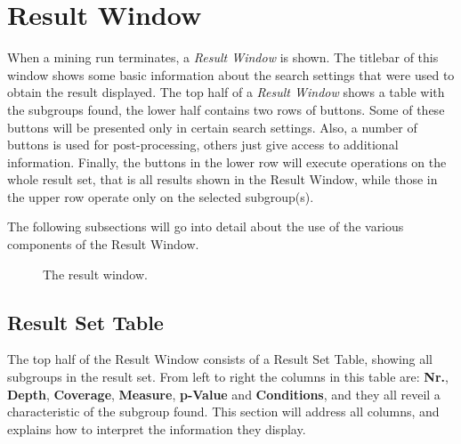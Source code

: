 \documentclass{article}
\begin{document}
\section{Result Window}
\label{section:result-window}
When a mining run terminates, a \emph{Result Window} is shown.
The titlebar of this window shows some basic information about the search settings that were used to obtain the result displayed.
The top half of a \emph{Result Window} shows a table with the subgroups found, the lower half contains two rows of buttons.
Some of these buttons will be presented only in certain search settings.
Also, a number of buttons is used for post-processing, others just give access to additional information.
Finally, the buttons in the lower row will execute operations on the whole result set, that is all results shown in the Result Window, while those in the upper row operate only on the selected subgroup(s).

The following subsections will go into detail about the use of the various components of the Result Window.

\begin{figure}
\begin{center}
\centering
{}
\caption{The result window.}
\end{center}
\label{fig:resultwindow}
\end{figure}


\subsection{Result Set Table}
\label{result-window:result-set-table}
The top half of the Result Window consists of a Result Set Table, showing all subgroups in the result set.
From left to right the columns in this table are: \textbf{Nr.}, \textbf{Depth}, \textbf{Coverage}, \textbf{Measure}, \textbf{p-Value} and \textbf{Conditions}, and they all reveil a characteristic of the subgroup found.
This section will address all columns, and explains how to interpret the information they display.
\end{document}
